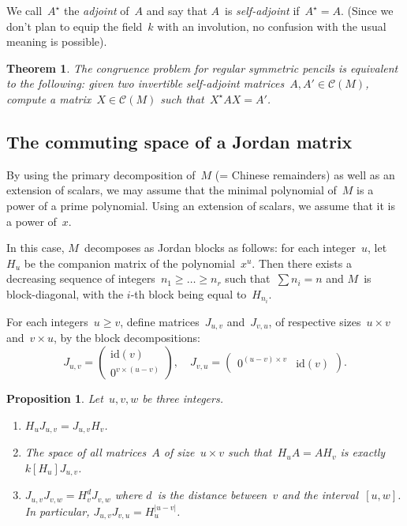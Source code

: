 \documentclass{article}%
\newtheorem{prop}{Proposition}
\newtheorem{thm}{Theorem}
\let\ro\mathscr
\def\abs#1{\left|#1\right|}
\def\mat#1{\begin{pmatrix}#1\end{pmatrix}}
\begin{document}
We call~$A^{⋆}$ the \emph{adjoint} of~$A$ and say that $A$~is
\emph{self-adjoint} if~$A^{⋆} = A$. (Since we don't plan to equip the
field~$k$ with an involution, no confusion with the usual meaning is
possible).

\begin{thm}\label{thm:IP1S-congruence}
The congruence problem for regular symmetric pencils is equivalent to the
following: given two invertible self-adjoint matrices~$A, A' ∈ \ro C(M)$,
compute a matrix~$X ∈ \ro C(M)$ such that~$X^{⋆} A X = A'$.
\end{thm}

\subsection{The commuting space of a Jordan matrix}%

By using the primary decomposition of~$M$ (= Chinese remainders) as well
as an extension of scalars, we may assume that the minimal polynomial
of~$M$ is a power of a prime polynomial. Using an extension of scalars, we
assume that it is a power of~$x$.

In this case, $M$~decomposes as Jordan blocks as follows: for each
integer~$u$, let~$H_u$ be the companion matrix of the polynomial~$x^u$.
Then there exists a decreasing sequence of integers~$n_1 ≥ … ≥ n_r$ such
that~$∑ n_i = n$ and $M$~is block-diagonal, with the $i$-th block being
equal to~$H_{n_i}$.

For each integers~$u ≥ v$, define matrices~$J_{u,v}$ and~$J_{v,u}$, of
respective sizes~$u × v$ and~$v × u$, by the block decompositions:
\begin{equation}
J_{u,v} = \mat{ \mathrm{id}(v) \\ 0^{v ×(u-v)}},\quad
J_{v,u} = \mat{ 0^{(u-v)× v } & \mathrm{id}(v)}.
\end{equation}

\begin{prop}\label{prop:rel-HJ}
Let~$u, v, w$ be three integers.
\begin{enumerate}
\item $H_{u} J_{u,v} = J_{u,v} H_{v}$.
\item The space of all matrices~$A$ of size~$u × v$ such that~$H_u A = A
H_v$ is exactly $k[H_u] J_{u,v}$.
\item \label{it:Juw} $J_{u,v} J_{v,w} = H_v^{d} J_{v,w}^{}$ where $d$~is
the distance between~$v$ and the interval~$[u,w]$. In particular,
$J_{u,v} J_{v,u} = H_{u}^{\abs{u-v}}$.
\end{enumerate}
\end{prop}
\end{document}
